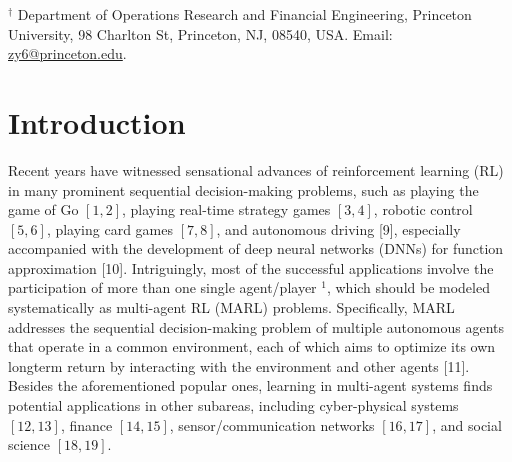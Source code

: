 \documentclass[10pt]{article}
\begin{document}
${ }^{\dagger}$ Department of Operations Research and Financial Engineering, Princeton University, 98 Charlton St, Princeton, NJ, 08540, USA. Email: \href{mailto:zy6@princeton.edu}{zy6@princeton.edu}.

\section{Introduction}
Recent years have witnessed sensational advances of reinforcement learning (RL) in many prominent sequential decision-making problems, such as playing the game of Go $[1,2]$, playing real-time strategy games $[3,4]$, robotic control $[5,6]$, playing card games $[7,8]$, and autonomous driving [9], especially accompanied with the development of deep neural networks (DNNs) for function approximation [10]. Intriguingly, most of the successful applications involve the participation of more than one single agent/player ${ }^{1}$, which should be modeled systematically as multi-agent RL (MARL) problems. Specifically, MARL addresses the sequential decision-making problem of multiple autonomous agents that operate in a common environment, each of which aims to optimize its own longterm return by interacting with the environment and other agents [11]. Besides the aforementioned popular ones, learning in multi-agent systems finds potential applications in other subareas, including cyber-physical systems $[12,13]$, finance $[14,15]$, sensor/communication networks $[16,17]$, and social science $[18,19]$.
\end{document}
